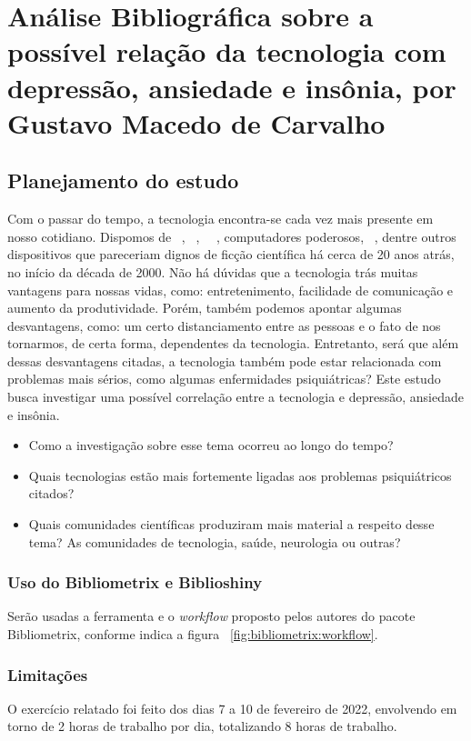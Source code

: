 \chapter{Análise Bibliográfica sobre a possível relação da tecnologia com depressão, ansiedade e insônia, por Gustavo Macedo de Carvalho\label{chap:bibliometria:GustavoMacCar}}

\section{Planejamento do estudo}
Com o passar do tempo, a tecnologia encontra-se cada vez mais presente em nosso cotidiano. Dispomos de \smartphones\ , \tablets\ , \smart\ \TVs\ , computadores poderosos, \smartwatches\ , dentre outros dispositivos que pareceriam
dignos de ficção científica há cerca de 20 anos atrás, no início da década de 2000. Não há dúvidas que a tecnologia trás muitas vantagens para nossas vidas, como: entretenimento, facilidade de comunicação e aumento da produtividade.
Porém, também podemos apontar algumas desvantagens, como: um certo distanciamento entre as pessoas e o fato de nos tornarmos, de certa forma, dependentes da tecnologia. Entretanto, será que além dessas desvantagens citadas, a tecnologia também
pode estar relacionada com problemas mais sérios, como algumas enfermidades psiquiátricas? Este estudo busca investigar uma possível correlação entre a tecnologia e depressão, ansiedade e insônia.
\begin{itemize}
    \item Como a investigação sobre esse tema ocorreu ao longo do tempo?
    \item Quais tecnologias estão mais fortemente ligadas aos problemas psiquiátricos citados?
    \item Quais comunidades científicas produziram mais material a respeito desse tema? As comunidades de tecnologia, saúde, neurologia ou outras?
\end{itemize}

\subsection{Uso do Bibliometrix e Biblioshiny}
Serão usadas a ferramenta e o \textit{workflow} proposto pelos autores do pacote Bibliometrix, conforme indica a figura ~\ref{fig:bibliometrix:workflow}.

\subsection{Limitações} O exercício relatado foi feito dos dias 7 a 10 de fevereiro de 2022, envolvendo em torno de 2 horas de trabalho por dia, totalizando 8 horas de trabalho.

